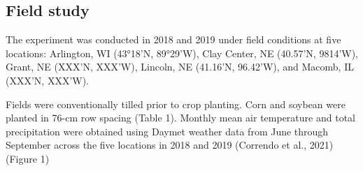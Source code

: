\documentclass[utf8]{frontiersSCNS}
\begin{document}
\hypertarget{field-study}{%
\subsection*{Field study}\label{field-study}}

The experiment was conducted in 2018 and 2019 under field conditions at
five locations: Arlington, WI (43°18'N, 89°29'W), Clay Center, NE
(40.57'N, 9814'W), Grant, NE (XXX'N, XXX'W), Lincoln, NE (41.16'N,
96.42'W), and Macomb, IL (XXX'N, XXX'W).

Fields were conventionally tilled prior to crop planting. Corn and
soybean were planted in 76-cm row spacing (Table 1). Monthly mean air
temperature and total precipitation were obtained using Daymet weather
data from June through September across the five locations in 2018 and
2019 (Correndo et al., 2021) (Figure 1)
\end{document}
